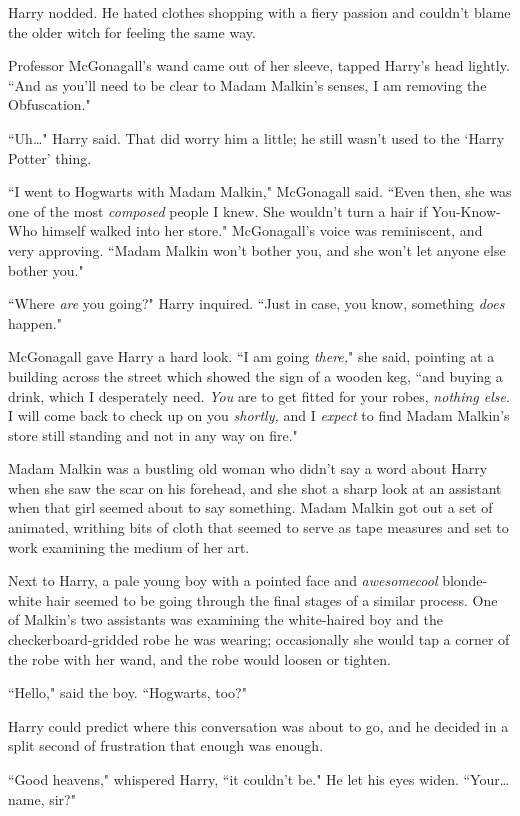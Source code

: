 Harry nodded. He hated clothes shopping with a fiery passion and couldn't blame the older witch for feeling the same way.

Professor McGonagall's wand came out of her sleeve, tapped Harry's head lightly. ``And as you'll need to be clear to Madam Malkin's senses, I am removing the Obfuscation."

``Uh{\ldots}" Harry said. That did worry him a little; he still wasn't used to the `Harry Potter' thing.

``I went to Hogwarts with Madam Malkin," McGonagall said. ``Even then, she was one of the most \emph{composed} people I knew. She wouldn't turn a hair if You-Know-Who himself walked into her store." McGonagall's voice was reminiscent, and very approving. ``Madam Malkin won't bother you, and she won't let anyone else bother you."

``Where \emph{are} you going?" Harry inquired. ``Just in case, you know, something \emph{does} happen."

McGonagall gave Harry a hard look. ``I am going \emph{there,}" she said, pointing at a building across the street which showed the sign of a wooden keg, ``and buying a drink, which I desperately need. \emph{You} are to get fitted for your robes, \emph{nothing else}. I will come back to check up on you \emph{shortly,} and I \emph{expect} to find Madam Malkin's store still standing and not in any way on fire."

Madam Malkin was a bustling old woman who didn't say a word about Harry when she saw the scar on his forehead, and she shot a sharp look at an assistant when that girl seemed about to say something. Madam Malkin got out a set of animated, writhing bits of cloth that seemed to serve as tape measures and set to work examining the medium of her art.

Next to Harry, a pale young boy with a pointed face and \emph{awesomecool} blonde-white hair seemed to be going through the final stages of a similar process. One of Malkin's two assistants was examining the white-haired boy and the checkerboard-gridded robe he was wearing; occasionally she would tap a corner of the robe with her wand, and the robe would loosen or tighten.

``Hello," said the boy. ``Hogwarts, too?"

Harry could predict where this conversation was about to go, and he decided in a split second of frustration that enough was enough.

``Good heavens," whispered Harry, ``it couldn't be." He let his eyes widen. ``Your{\ldots} name, sir?"

